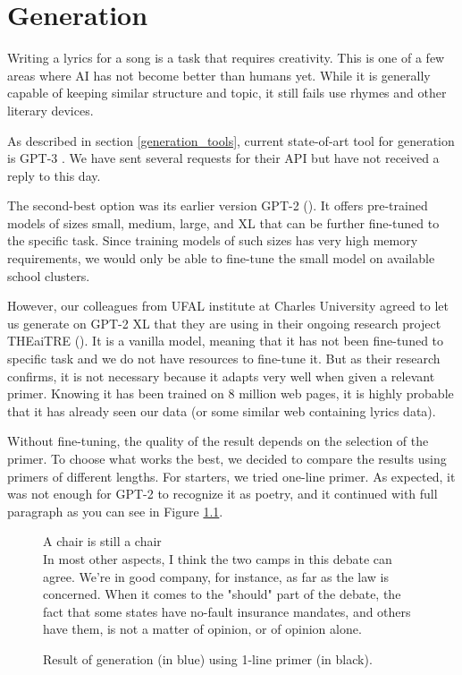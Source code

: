 \chapter{Generation}\label{generation}
Writing a lyrics for a song is a task that requires creativity. This is one of a few areas where AI has not become better than humans yet. While it is generally capable of keeping similar structure and topic, it still fails use rhymes and other literary devices.

As described in section \ref{generation_tools}, current state-of-art tool for generation is GPT-3 \cite{brown2020gpt3}. We have sent several requests for their API but have not received a reply to this day.

The second-best option was its earlier version GPT-2 (\cite{radford2019gpt2}). It offers pre-trained models of sizes small, medium, large, and XL that can be further fine-tuned to the specific task. Since training models of such sizes has very high memory requirements, we would only be able to fine-tune the small model on available school clusters. 

However, our colleagues from UFAL institute at Charles University agreed to let us generate on GPT-2 XL that they are using in their ongoing research project THEaiTRE (\cite{rosa2021theaitre}). It is a vanilla model, meaning that it has not been fine-tuned to specific task and we do not have resources to fine-tune it. But as their research confirms, it is not necessary because it adapts very well when given a relevant primer. Knowing it has been trained on 8 million web pages, it is highly probable that it has already seen our data (or some similar web containing lyrics data). 

Without fine-tuning, the quality of the result depends on the selection of the primer. To choose what works the best, we decided to compare the results using primers of different lengths. For starters, we tried one-line primer. As expected, it was not enough for GPT-2 to recognize it as poetry, and it continued with full paragraph as you can see in Figure \ref{fig_1line_primer}.

\begin{figure}[htb]\centering
	A chair is still a chair \\
	\color{blue}In most other aspects, I think the two camps in this debate can agree. We're in good company, for instance, as far as the law is concerned. When it comes to the "should" part of the debate, the fact that some states have no-fault insurance mandates, and others have them, is not a matter of opinion, or of opinion alone. \\
	\endminipage\hfill
	\caption{Result of generation (in blue) using 1-line primer (in black).} \label{fig_1line_primer}
\end{figure} 


